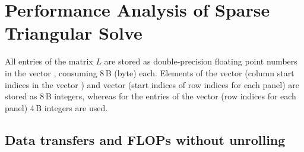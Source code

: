 \section{Performance Analysis of Sparse Triangular Solve}
\label{sec:sds}


All entries %
of the matrix $L$
are stored as double-precision floating point
numbers in the vector \vlnz{}, consuming $8$\,B (byte) each.
Elements of the vector \vxlnz{} (column start indices in the vector \vlnz{}) and vector \vxindx{} (start
indices of row indices for each panel) are stored as $8$\,B integers,
whereas for the entries of the vector \vindx{} (row indices for each panel) $4$\,B integers
are used.

\subsection{Data transfers and FLOPs without unrolling}
\label{sec:pm:dt}
\label{sec:pm:dt:wou}

% 

